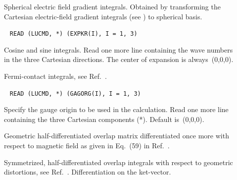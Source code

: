 \begin{description}
\item[] Spherical electric field gradient
integrals. Obtained by transforming the Cartesian electric-field
gradient integrals (see ) to spherical basis.

\item[]\verb| |\newline
\verb|READ (LUCMD, *) (EXPKR(I), I = 1, 3)|

Cosine and sine integrals.
Read one more line containing the wave numbers in the three Cartesian
directions. The center of expansion is always~(0,0,0).

\item[] Fermi-contact integrals, see
Ref.~\cite{ovhapjhjajsbpthjcp96}.


\item[]\verb| |\newline
\verb|READ (LUCMD, *) (GAGORG(I), I = 1, 3)|

Specify the gauge origin to be used in the
calculation. Read one more line containing the three Cartesian
components (*). Default is~(0,0,0).

\item[] Geometric half-differentiated overlap
matrix
differentiated once more with respect to magnetic field as given in Eq.~(59)
in Ref.~\cite{klbpjthkrhjajjcp98}.

\item[] Symmetrized, half-differentiated
overlap integrals with respect to geometric distortions, see
Ref.~\cite{klbpjhjajjothjcp97}. Differentiation on the ket-vector.



\end{description}
